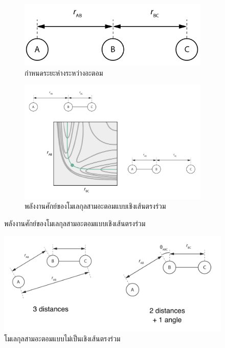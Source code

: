 \begin{figure}[htbp]
    \centering
    \begin{subfigure}{0.5\textwidth}
        \centering
        \includegraphics[width=0.9\linewidth]{fig/3-body_collinear.png}
        \caption{กำหนดระยะห่างระหว่างอะตอม}
        \label{fig:3_body_mol}
    \end{subfigure}%
    \begin{subfigure}{0.5\textwidth}
        \centering
        \includegraphics[width=0.9\linewidth]{fig/3-body_collinear_PES.png}
        \caption{พลังงานศักย์ของโมเลกุลสามอะตอมแบบเชิงเส้นตรงร่วม}
        \label{fig:PES_3_body_mol}
    \end{subfigure}
    \label{fig:3_body_mol_and_PES}
\end{figure}

\begin{figure}[htbp]
    \centering
    \includegraphics[width=0.8\linewidth]{fig/3-body_non-collinear.png}
    \caption{โมเลกุลสามอะตอมแบบไม่เป็นเชิงเส้นตรงร่วม}
    \label{fig:non_collinear}
\end{figure}

